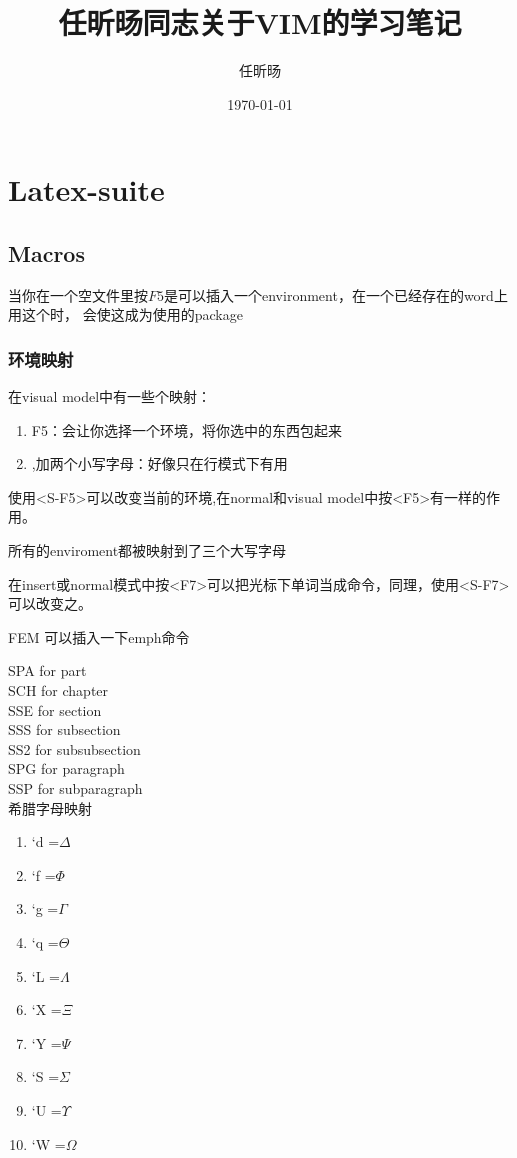 \documentclass[UTF8]{ctexart}
\title{任昕旸同志关于VIM的学习笔记}
\author{任昕旸}
\date{\today}
\begin{document}
\maketitle
\tableofcontents
\section{Latex-suite}
\subsection{Macros}
当你在一个空文件里按$F5$是可以插入一个environment，在一个已经存在的word上用这个时，
会使这成为使用的package
\subsubsection{环境映射}
在visual model中有一些个映射：

\begin{enumerate}
    \item F5：会让你选择一个环境，将你选中的东西包起来
    \item ,加两个小写字母：好像只在行模式下有用
\end{enumerate}

使用<S-F5>可以改变当前的环境,在normal和visual model中按<F5>有一样的作用。

所有的enviroment都被映射到了三个大写字母

在insert或normal模式中按<F7>可以把光标下单词当成命令，同理，使用<S-F7>可以改变之。

FEM 可以插入一下emph命令


    SPA for part         \\
    SCH for chapter      \\
    SSE for section      \\
    SSS for subsection   \\
    SS2 for subsubsection\\
    SPG for paragraph    \\
    SSP for subparagraph \\


希腊字母映射
\begin{enumerate}
    \item `d =$ \Delta$
    \item `f =$ \Phi$
    \item `g =$ \Gamma$
    \item `q =$ \Theta$
    \item `L =$ \Lambda$
    \item `X =$ \Xi$
    \item `Y =$ \Psi$
    \item `S =$ \Sigma$
    \item `U =$ \Upsilon$
    \item `W =$ \Omega$
\end{enumerate}
\end{document}
